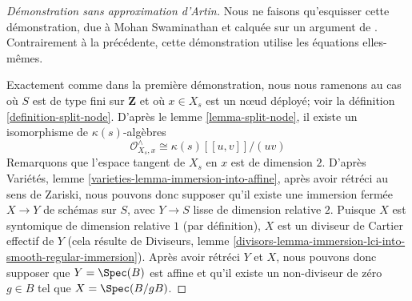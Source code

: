 \begin{proof}[Démonstration sans approximation d'Artin] Nous ne faisons qu'esquisser cette démonstration, due à Mohan Swaminathan et calquée sur un argument de \cite[Proposition X.2.1]{ACG}. Contrairement à la précédente, cette démonstration utilise les équations elles-mêmes.

\medskip\noindent
Exactement comme dans la première démonstration, nous nous ramenons au cas où $S$ est de type fini sur $\mathbf{Z}$ et où $x \in X_s$ est un nœud déployé; voir la définition \ref{definition-split-node}. D'après le lemme \ref{lemma-split-node}, il existe un isomorphisme de $\kappa(s)$-algèbres $$
\mathcal{O}_{X_s, x}^\wedge \cong \kappa(s)[[u, v]]/(uv)
$$ Remarquons que l'espace tangent de $X_s$ en $x$ est de dimension $2$. D'après Variétés, lemme \ref{varieties-lemma-immersion-into-affine}, après avoir rétréci au sens de Zariski, nous pouvons donc supposer qu'il existe une immersion fermée $X \to Y$ de schémas sur $S$, avec $Y \to S$ lisse de dimension relative $2$. Puisque $X$ est syntomique de dimension relative $1$ (par définition), $X$ est un diviseur de Cartier effectif de $Y$ (cela résulte de Diviseurs, lemme \ref{divisors-lemma-immersion-lci-into-smooth-regular-immersion}). Après avoir rétréci $Y$ et $X$, nous pouvons donc supposer que $Y = \Spec(B)$ est affine et qu'il existe un non-diviseur de zéro $g \in B$ tel que $X = \Spec(B/gB)$.


\end{proof}
